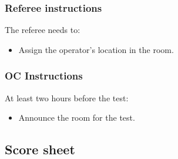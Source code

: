 \subsubsection*{Referee instructions}
The referee needs to:
\begin{itemize}[nosep]
	\item Assign the operator's location in the room.
\end{itemize}

\subsubsection*{OC Instructions}
At least two hours before the test:
\begin{itemize}[nosep]
	\item Announce the room for the test.
\end{itemize}

\subsection*{Score sheet}

